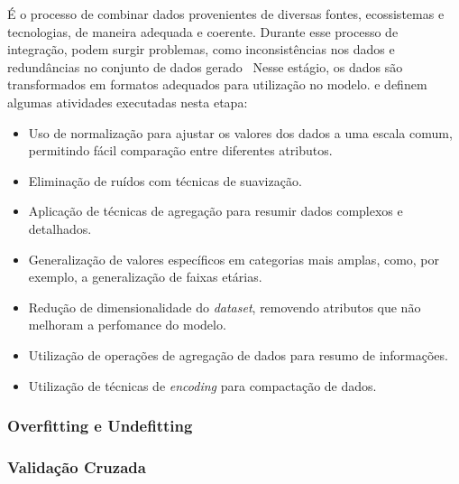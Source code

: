                 É o processo de combinar dados provenientes de diversas fontes, ecossistemas e tecnologias, de maneira adequada 
                e coerente. Durante esse processo de integração, podem surgir problemas, como inconsistências nos dados e 
                redundâncias no conjunto de dados gerado~\cite{sivakumar2017, silva2021, oliveira2024}
            Nesse estágio, os dados são transformados em formatos adequados para utilização no modelo. 
             e  definem algumas atividades executadas nesta etapa:

            \begin{itemize} 
                \item Uso de normalização para ajustar os valores dos dados a uma escala comum, permitindo fácil comparação entre 
                diferentes atributos. 
                \item Eliminação de ruídos com técnicas de suavização. 
                \item Aplicação de técnicas de agregação para resumir dados complexos e detalhados. 
                \item Generalização de valores específicos em categorias mais amplas, como, por exemplo, a generalização de 
                faixas etárias. 
            \end{itemize}

            \begin{itemize}
                \item Redução de dimensionalidade do \emph{dataset}, removendo atributos que não melhoram a perfomance do modelo.
                \item Utilização de operações de agregação de dados para resumo de informações.
                \item Utilização de técnicas de \emph{encoding} para compactação de dados.
            \end{itemize}

        \subsubsection{Overfitting e Undefitting}

        \subsubsection{Validação Cruzada}


